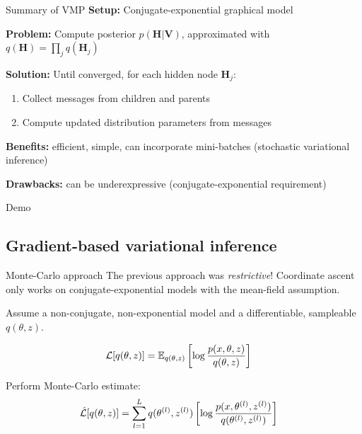 \documentclass[10pt, compress]{beamer}
\begin{document}
\begin{frame}{Summary of VMP}
  \textbf{Setup:} Conjugate-exponential graphical model

  \pause
  \textbf{Problem:} Compute posterior $p(\mathbf{H} | \mathbf{V})$, approximated with $q(\mathbf{H}) = \prod_j q(\mathbf{H}_j)$

  \pause
  \textbf{Solution:} Until converged, for each hidden node $\mathbf{H}_j$:
  \begin{enumerate}
      \pause
    \item Collect messages from children and parents
      \pause
    \item Compute updated distribution parameters from messages
  \end{enumerate}

  \pause
  \textbf{Benefits:} efficient, simple, can incorporate mini-batches (stochastic variational inference)

  \pause
  \textbf{Drawbacks:} can be underexpressive (conjugate-exponential requirement)
\end{frame}

\begin{frame}[standout]
  Demo
\end{frame}

\subsection{Gradient-based variational inference}

\begin{frame}{Monte-Carlo approach}
  The previous approach was \emph{restrictive}! Coordinate ascent only
  works on conjugate-exponential models with the mean-field
  assumption.

  \pause

  Assume a non-conjugate, non-exponential model and a differentiable, sampleable
  $q(\theta, z)$.

  \pause

  \begin{align*}
    \mathcal{L}[q(\theta, z)] &= \mathbb{E}_{q(\theta, z)}\left[\log\frac{p(x, \theta, z)}{q(\theta, z)}\right]
  \end{align*}

  \pause

  Perform Monte-Carlo estimate:
  \begin{align*}
    \hat{\mathcal{L}}[q(\theta, z)] &= \sum_{l = 1}^L {q(\theta^{(l)}, z^{(l)})}\left[\log\frac{p(x, \theta^{(l)}, z^{(l)})}{q(\theta^{(l)}, z^{(l)})}\right]
  \end{align*}
\end{frame}
\end{document}
